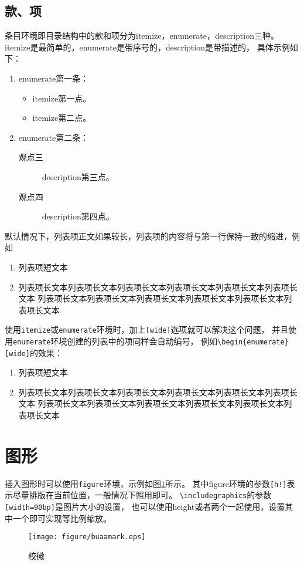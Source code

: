 \subsection{款、项}
\label{subsec-item}
条目环境即目录结构中的款和项分为itemize，enumerate，description三种。
itemize是最简单的，enumerate是带序号的，description是带描述的，
具体示例如下：

\begin{enumerate}
    \item enumerate第一条：
        \begin{itemize}
            \item itemize第一点。
            \item itemize第二点。
        \end{itemize}
    \item enumerate第二条：
        \begin{description}
            \item[观点三] description第三点。
            \item[观点四] description第四点。
        \end{description}
\end{enumerate}

默认情况下，列表项正文如果较长，列表项的内容将与第一行保持一致的缩进，例如

\begin{enumerate}
\item 列表项短文本
\item 列表项长文本列表项长文本列表项长文本列表项长文本列表项长文本列表项长文本
列表项长文本列表项长文本列表项长文本列表项长文本列表项长文本列表项长文本
\end{enumerate}

使用\verb|itemize|或\verb|enumerate|环境时，加上\verb|[wide]|选项就可以解决这个问题，
并且使用\verb|enumerate|环境创建的列表中的项同样会自动编号，
例如\verb|\begin{enumerate}[wide]|的效果：

\begin{enumerate}[wide]
\item 列表项短文本
\item 列表项长文本列表项长文本列表项长文本列表项长文本列表项长文本列表项长文本
列表项长文本列表项长文本列表项长文本列表项长文本列表项长文本列表项长文本
\end{enumerate}

\section{图形}
\label{sec-figure}
插入图形时可以使用\texttt{figure}环境，示例如图\ref{fig-sample}所示。
其中figure环境的参数\verb|[h!]|表示尽量排版在当前位置，一般情况下照用即可。
\verb|\includegraphics|的参数\verb|[width=90bp]|是图片大小的设置，
也可以使用height或者两个一起使用，设置其中一个即可实现等比例缩放。
\begin{figure}[h!]
    \centering
    \texttt{[image: figure/buaamark.eps]}
    \caption{校徽}
    \label{fig-sample}
\end{figure}

